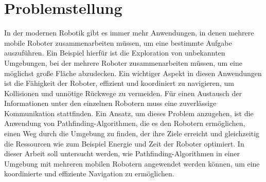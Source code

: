 \section{Problemstellung}
In der modernen Robotik gibt es immer mehr Anwendungen, in denen mehrere mobile Roboter zusammenarbeiten müssen, um eine bestimmte Aufgabe auszuführen. Ein Beispiel hierfür ist die Exploration von unbekannten Umgebungen, bei der mehrere Roboter zusammenarbeiten müssen, um eine möglichst große Fläche abzudecken. Ein wichtiger Aspekt in diesen Anwendungen ist die Fähigkeit der Roboter, effizient und koordiniert zu navigieren, um Kollisionen und unnötige Rückwege zu vermeiden. Für einen Austausch der Informationen unter den einzelnen Robotern muss eine zuverlässige Kommunikation stattfinden.
Ein Ansatz, um dieses Problem anzugehen, ist die Anwendung von Pathfinding-Algorithmen, die es den Robotern ermöglichen, einen Weg durch die Umgebung zu finden, der ihre Ziele erreicht und gleichzeitig die Ressourcen wie zum Beispiel Energie und Zeit der Roboter optimiert. In dieser Arbeit soll untersucht werden, wie Pathfinding-Algorithmen in einer Umgebung mit mehreren mobilen Robotern angewendet werden können, um eine koordinierte und effiziente Navigation zu ermöglichen. 

